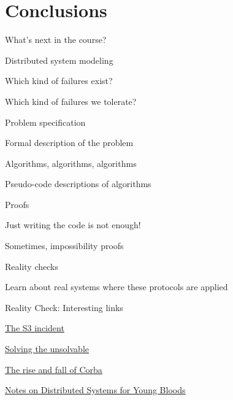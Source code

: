 \section{Conclusions}

\begin{frame}{What's next in the course?}
\BI
\item Distributed system modeling
\BI
\item Which kind of failures exist? 
\item Which kind of failures we tolerate?
\EI
\bigskip
\item Problem specification
\BI
\item Formal description of the problem
\EI
\item Algorithms, algorithms, algorithms
\BI
\item Pseudo-code descriptions of algorithms
\EI
\bigskip
\item Proofs
\BI
\item Just writing the code is not enough!
\item Sometimes, impossibility proofs
\EI
\bigskip
\item Reality checks
\BI
\item Learn about real systems where these protocols are applied
\EI
\EI
\end{frame}



\begin{RMFrame}

\BI
\item {}
\item {}
\EI

\end{RMFrame}

\begin{PlainFrame}{Reality Check: Interesting links}

\BI
\item \href{http://status.aws.amazon.com/s3-20080720.html}{\underline{The S3 incident}}
\item \href{http://cacm.acm.org/magazines/2011/7/109895-solving-the-unsolvable/fulltext}{\underline{Solving the unsolvable}}
\item \href{http://queue.acm.org/detail.cfm?id=1142044}{\underline{The rise and fall of Corba}}
\item \href{https://www.somethingsimilar.com/2013/01/14/notes-on-distributed-systems-for-young-bloods/}{\underline{Notes on Distributed Systems for Young Bloods}}
\EI

\end{PlainFrame}


 


